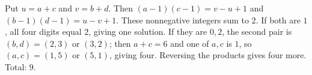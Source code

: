Put $u=a+c$ and $v=b+d$. Then $(a-1)(c-1)=v-u+1$ and $(b-1)(d-1)=u-v+1$. These nonnegative integers sum to $2$. If both are $1$, all four digits equal $2$, giving one solution. If they are $0,2$, the second pair is $(b,d)=(2,3)$ or $(3,2)$; then $a+c=6$ and one of $a,c$ is $1$, so $(a,c)=(1,5)$ or $(5,1)$, giving four. Reversing the products gives four more. Total: $\boxed9$.
